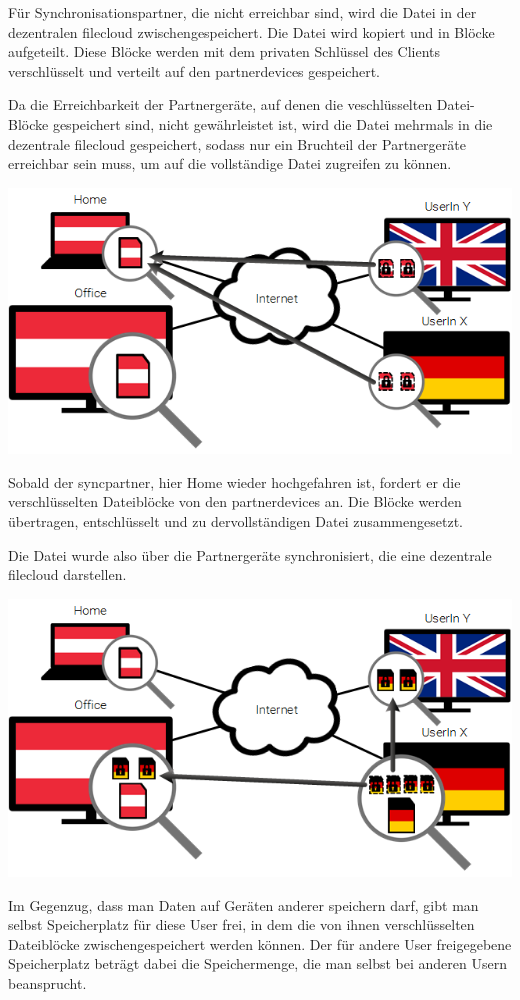 Für Synchronisationspartner, die nicht erreichbar sind, wird die Datei in der dezentralen
\gls{filecloud} zwischengespeichert. Die Datei wird kopiert und in Blöcke
aufgeteilt. Diese Blöcke werden mit dem privaten Schlüssel des Clients
verschlüsselt und verteilt auf den \glspl{partnerdevice} gespeichert.

Da die Erreichbarkeit der Partnergeräte, auf denen die veschlüsselten
Datei-Blöcke gespeichert sind, nicht gewährleistet ist, wird die Datei mehrmals
in die dezentrale \gls{filecloud} gespeichert, sodass nur ein Bruchteil der
Partnergeräte erreichbar sein muss, um auf die vollständige Datei zugreifen zu
können.

\includegraphics[]{images/sblit_2}

Sobald der \gls{syncpartner}, hier Home wieder hochgefahren ist, fordert er die
verschlüsselten Dateiblöcke von den \glspl{partnerdevice} an. Die Blöcke werden
übertragen, entschlüsselt und zu dervollständigen Datei zusammengesetzt.

Die Datei wurde also über die Partnergeräte synchronisiert, die eine dezentrale
\gls{filecloud} darstellen.

\includegraphics[]{images/sblit_3}

Im Gegenzug, dass man Daten auf Geräten anderer speichern darf, gibt man selbst
Speicherplatz für diese User frei, in dem die von ihnen verschlüsselten
Dateiblöcke zwischengespeichert werden können. Der für andere User freigegebene
Speicherplatz beträgt dabei die Speichermenge, die man selbst bei anderen Usern
beansprucht.
